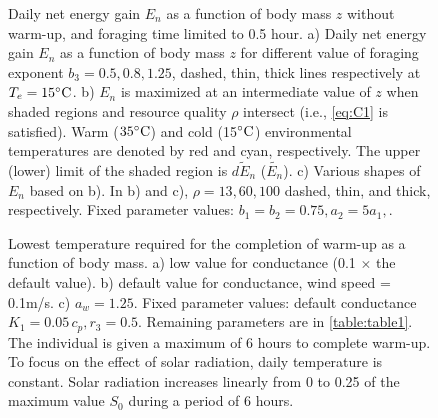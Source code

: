 \newpage
%
\begin{figure}[H]
\begin{center}
\caption{
	 Daily net energy gain  $E_n$ as a function of body mass $z$ without warm-up, and foraging time limited to 0.5 hour.
	a) Daily net energy gain  $E_n$ as a function of body mass $z$ for different value of foraging exponent $b_3 = 0.5, 0.8, 1.25$, dashed, thin, thick lines respectively  at $T_e  = 15 ^{\circ} \rm{C}$.
	b) $E_n$ is maximized at an intermediate value of $z$  when shaded regions and resource quality $\rho$ intersect (i.e., \cref{eq:C1} is satisfied).
	Warm ($35^{\circ} \rm{C}$) and cold (15$^{\circ} \rm{C}$) environmental temperatures are denoted by red and cyan, respectively.
	The upper (lower) limit of the shaded region is $\widetilde{dE_n}$ ($\widetilde{E_n}$).
	c) Various shapes of $E_n$ based on b).
	In b) and c), $\rho = 13, 60, 100$ dashed, thin, and thick, respectively.
	Fixed parameter values: $b_1 = b_2 = 0.75, a_2 = 5 a_1, $.
}
\label{fig3}
\end{center}
\end{figure}
%
\begin{figure}[H]
\begin{center}
\caption{
	Lowest temperature required for the completion of warm-up as a function of body mass.
	a)  low value for conductance (0.1 $\times$ the default value).
	b) default value for conductance, wind speed  = 0.1m/s.
	c)  $a_w = 1.25$.
	Fixed parameter values: default conductance $K_1 = 0.05 \, c_p, r_3 = 0.5$.
	Remaining parameters are in \cref{table:table1}.
	The individual is given a maximum of 6 hours to complete warm-up.
	To focus on the effect of solar radiation, daily temperature is constant.
	Solar radiation increases linearly from 0 to 0.25 of the maximum value $S_0$ during a period of 6 hours.
}%
\label{fig4}
\end{center}
\end{figure}
